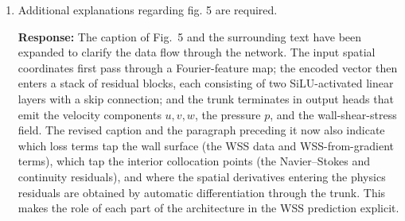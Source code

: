 \documentclass[11pt]{article}
\begin{document}
\begin{enumerate}[]
    \item Additional explanations regarding fig. 5 are required.

    \textbf{Response:} The caption of Fig.~5 and the surrounding text have been expanded to clarify the data flow through the network. The input spatial coordinates first pass through a Fourier-feature map; the encoded vector then enters a stack of residual blocks, each consisting of two SiLU-activated linear layers with a skip connection; and the trunk terminates in output heads that emit the velocity components $u,v,w$, the pressure $p$, and the wall-shear-stress field. The revised caption and the paragraph preceding it now also indicate which loss terms tap the wall surface (the WSS data and WSS-from-gradient terms), which tap the interior collocation points (the Navier--Stokes and continuity residuals), and where the spatial derivatives entering the physics residuals are obtained by automatic differentiation through the trunk. This makes the role of each part of the architecture in the WSS prediction explicit.
\end{enumerate}
\end{document}
